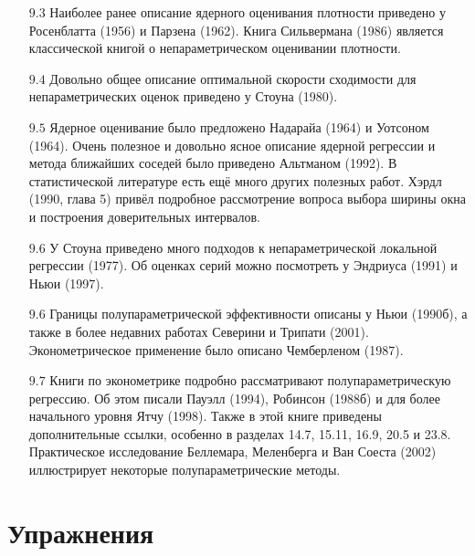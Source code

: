 \begin{itemize}
\item [$9.3$] Наиболее ранее описание ядерного оценивания плотности приведено у Росенблатта (1956) и Парзена (1962). Книга Сильвермана (1986) является классической книгой о непараметрическом оценивании плотности.
\item [$9.4$] Довольно общее описание оптимальной скорости сходимости для непараметрических оценок приведено у Стоуна (1980).
\item [$9.5$] Ядерное оценивание было предложено Надарайа (1964) и Уотсоном (1964). Очень полезное и довольно ясное описание ядерной регрессии и метода ближайших соседей было приведено Альтманом (1992). В статистической литературе есть ещё много других полезных работ. Хэрдл (1990, глава 5) привёл подробное рассмотрение вопроса выбора ширины окна и построения доверительных интервалов.
\item [$9.6$] У Стоуна приведено много подходов к непараметрической локальной регрессии (1977). Об оценках серий можно посмотреть у Эндриуса (1991) и Ньюи (1997). 
\item [$9.6$] Границы полупараметрической эффективности описаны у Ньюи (1990б), а также в более недавних работах Северини и Трипати (2001). Эконометрическое применение было описано Чемберленом (1987).
\item [$9.7$] Книги по эконометрике подробно рассматривают полупараметрическую регрессию. Об этом писали Пауэлл (1994), Робинсон (1988б) и для более начального уровня Ятчу (1998). Также в этой книге приведены дополнительные ссылки, особенно в разделах 14.7, 15.11, 16.9, 20.5 и 23.8. Практическое исследование Беллемара, Меленберга и Ван Соеста (2002) иллюстрирует некоторые полупараметрические методы. 
\end{itemize}


\section{Упражнения}

